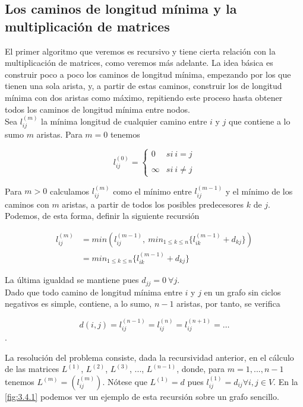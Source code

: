 \subsection{Los caminos de longitud mínima y la multiplicación de matrices}\label{sec:3.4.1}

El primer algoritmo que veremos es recursivo y tiene cierta relación con la multiplicación de matrices, como veremos más adelante. La idea básica es construir poco a poco los caminos de longitud mínima, empezando por los que tienen una sola arista, y, a partir de estas caminos, construir los de longitud mínima con dos aristas como máximo, repitiendo este proceso hasta obtener todos los caminos de longitud mínima entre nodos. \\

Sea $l_{ij}^{(m)}$ la mínima longitud de cualquier camino entre $i$ y $j$ que contiene a lo sumo $m$ aristas. Para $m=0$ tenemos 

$$l_{ij}^{(0)}= \left\{ \begin{array}{lcc}
	0 &   si\ i=j \\
	\\ \infty & si\ i\neq j
\end{array}
\right.$$

Para $m>0$ calculamos $l_{ij}^{(m)}$ como el mínimo entre $l_{ij}^{(m-1)}$ y el mínimo de los caminos con $m$ aristas, a partir de todos los posibles predecesores $k$ de $j$. Podemos, de esta forma, definir la siguiente recursión

\begin{align*}
	l_{ij}^{(m)} & =min(l_{ij}^{(m-1)},\ min_{1\leq k\leq n}\{l_{ik}^{(m-1)}+d_{kj}\}) \\
	& =min_{1\leq k\leq n}\{l_{ik}^{(m-1)}+d_{kj}\}
\end{align*}

La última igualdad se mantiene pues $d_{jj}=0\ \forall j$. \\

Dado que todo camino de longitud mínima entre $i$ y $j$ en un grafo sin ciclos negativos es simple, contiene, a lo sumo, $n-1$ aristas, por tanto, se verifica

$$d(i,j)=l_{ij}^{(n-1)}=l_{ij}^{(n)}=l_{ij}^{(n+1)}=\dots$$.

La resolución del problema consiste, dada la recursividad anterior, en el cálculo de las matrices $L^{(1)}$, $L^{(2)}$, $L^{(3)}$, ..., $L^{(n-1)}$, donde, para $m=1,...,n-1$ tenemos $L^{(m)}=(l_{ij}^{(m)})$. Nótese que $L^{(1)}=d$ pues $l_{ij}^{(1)}=d_{ij}\forall i,j\in V$. En la \autoref{fig:3.4.1} podemos ver un ejemplo de esta recursión sobre un grafo sencillo.\\

